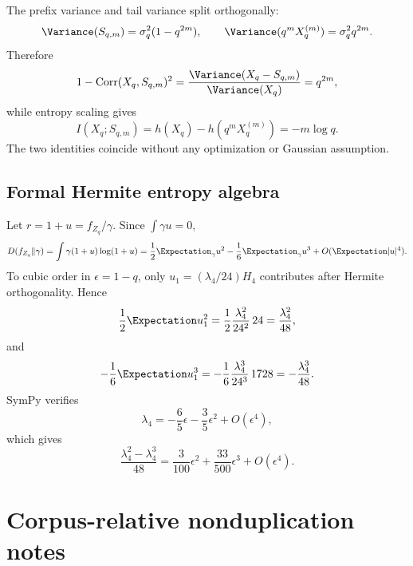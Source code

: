 \documentclass[11pt,oneside]{article}
\theoremstyle{definition}
\theoremstyle{remark}
\newcommand{\Corr}{\operatorname{Corr}}
\begin{document}
The prefix variance and tail variance split orthogonally:
\[
 \Variance(S_{q,m})=\sigma_q^2(1-q^{2m}),
 \qquad
 \Variance(q^mX_q^{(m)})=\sigma_q^2q^{2m}.
\]
Therefore
\[
 1-\Corr(X_q,S_{q,m})^2
 =\frac{\Variance(X_q-S_{q,m})}{\Variance(X_q)}=q^{2m},
\]
while entropy scaling gives
\[
 I(X_q;S_{q,m})
 =h(X_q)-h(q^mX_q^{(m)})=-m\log q.
\]
The two identities coincide without any optimization or Gaussian assumption.

\subsection{Formal Hermite entropy algebra}

Let $r=1+u=f_{Z_q}/\gamma$.  Since $\int\gamma u=0$,
\[
 D(f_{Z_q}\|\gamma)
 =\int\gamma(1+u)\log(1+u)
 =\frac12\Expectation_\gamma u^2-\frac16\Expectation_\gamma u^3+O(\Expectation|u|^4).
\]
To cubic order in $\epsilon=1-q$, only
$u_1=(\lambda_4/24)H_4$ contributes after Hermite orthogonality.  Hence
\[
 \frac12\Expectation u_1^2
 =\frac12\frac{\lambda_4^2}{24^2}\,24
 =\frac{\lambda_4^2}{48},
\]
and
\[
 -\frac16\Expectation u_1^3
 =-\frac16\frac{\lambda_4^3}{24^3}\,1728
 =-\frac{\lambda_4^3}{48}.
\]
SymPy verifies
\[
 \lambda_4=-\frac65\epsilon-\frac35\epsilon^2+O(\epsilon^4),
\]
which gives
\[
 \frac{\lambda_4^2-\lambda_4^3}{48}
 =\frac3{100}\epsilon^2+\frac{33}{500}\epsilon^3+O(\epsilon^4).
\]

\section{Corpus-relative nonduplication notes}
\label{app:audit}
\end{document}
